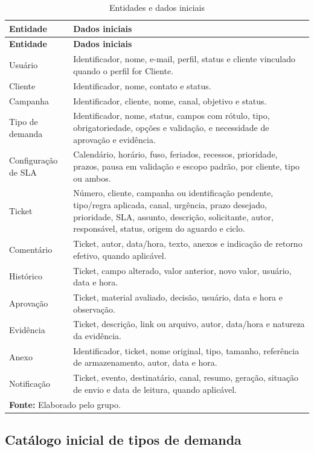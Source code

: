 \begin{longtable}{p{}p{}}
\caption{Entidades e dados iniciais}\label{tab:dados-principais}\\
\hline
\textbf{Entidade} & \textbf{Dados iniciais} \\
\hline
\endfirsthead
\hline
\textbf{Entidade} & \textbf{Dados iniciais} \\
\hline
\endhead
Usuário & Identificador, nome, e-mail, perfil, status e cliente vinculado quando o perfil for Cliente. \\
Cliente & Identificador, nome, contato e status. \\
Campanha & Identificador, cliente, nome, canal, objetivo e status. \\
Tipo de demanda & Identificador, nome, status, campos com rótulo, tipo, obrigatoriedade, opções e validação, e necessidade de aprovação e evidência. \\
Configuração de SLA & Calendário, horário, fuso, feriados, recessos, prioridade, prazos, pausa em validação e escopo padrão, por cliente, tipo ou ambos. \\
Ticket & Número, cliente, campanha ou identificação pendente, tipo/regra aplicada, canal, urgência, prazo desejado, prioridade, SLA, assunto, descrição, solicitante, autor, responsável, status, origem do aguardo e ciclo. \\
Comentário & Ticket, autor, data/hora, texto, anexos e indicação de retorno efetivo, quando aplicável. \\
Histórico & Ticket, campo alterado, valor anterior, novo valor, usuário, data e hora. \\
Aprovação & Ticket, material avaliado, decisão, usuário, data e hora e observação. \\
Evidência & Ticket, descrição, link ou arquivo, autor, data/hora e natureza da evidência. \\
Anexo & Identificador, ticket, nome original, tipo, tamanho, referência de armazenamento, autor, data e hora. \\
Notificação & Ticket, evento, destinatário, canal, resumo, geração, situação de envio e data de leitura, quando aplicável. \\
\hline
\multicolumn{2}{l}{\footnotesize\textbf{Fonte:} Elaborado pelo grupo.}
\end{longtable}

\subsection{Catálogo inicial de tipos de demanda}

